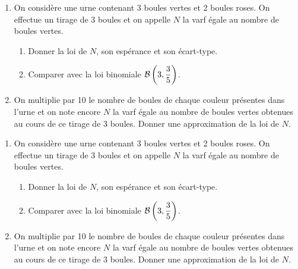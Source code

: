 \documentclass[a4paper, 11pt,reqno]{article}
\begin{document}
\begin{exercice}
	\begin{enumerate}
		\item
		      On consid\`ere une urne contenant 3 boules vertes et 2 boules roses. On effectue un tirage de 3 boules et on appelle $N$ la varf \'egale au nombre de boules vertes.
		      \begin{enumerate}
			      \item Donner la loi de $N$, son esp\'erance et son \'ecart-type.
			      \item Comparer avec la loi binomiale $\mathcal{B}\left( 3,\displaystyle\frac{3}{5} \right)$.
		      \end{enumerate}
		\item On multiplie par 10 le nombre de boules de chaque couleur pr\'esentes dans l'urne et on note encore $N$ la varf \'egale au nombre de boules vertes obtenues au cours de ce tirage de 3 boules. Donner une approximation de la loi de $N$.
	\end{enumerate}
\end{exercice}
\begin{correction}
	\begin{enumerate}
		\item
		      On consid\`ere une urne contenant 3 boules vertes et 2 boules roses. On effectue un tirage de 3 boules et on appelle $N$ la varf \'egale au nombre de boules vertes.
		      \begin{enumerate}
			      \item Donner la loi de $N$, son esp\'erance et son \'ecart-type.
			      \item Comparer avec la loi binomiale $\mathcal{B}\left( 3,\displaystyle\frac{3}{5} \right)$.
		      \end{enumerate}
		\item On multiplie par 10 le nombre de boules de chaque couleur pr\'esentes dans l'urne et on note encore $N$ la varf \'egale au nombre de boules vertes obtenues au cours de ce tirage de 3 boules. Donner une approximation de la loi de $N$.
	\end{enumerate}
\end{correction}
\end{document}

